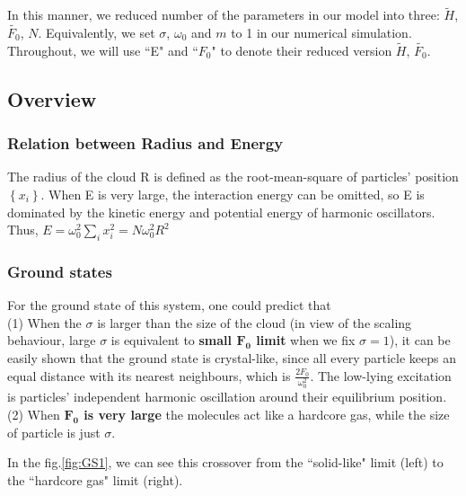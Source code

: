 \documentclass[aps,pre,twocolumn
,groupedaddress]{revtex4-1}
\begin{document}
In this manner, we reduced number of the parameters in our model into three: $\tilde{H}$, $\tilde{F_0}$, $N$. Equivalently, we set $\sigma$, $\omega_0$ and $m$ to 1 in our numerical simulation. Throughout, we will use ``E" and ``$F_0$" to denote their reduced version  $\tilde{H}$, $\tilde{F_0}$.

\subsection{Overview}
\subsubsection{Relation between Radius and Energy}
The radius of the cloud R is defined as the root-mean-square of particles' position $\left\lbrace x_i\right\rbrace$. When E is very large, the interaction energy can be omitted, so E is dominated by the kinetic energy and potential energy of harmonic oscillators. Thus, $E=\omega_0^2\sum_{i}x_i^2=N\omega_0^2R^2$ 

\begin{comment}
\begin{figure}
\centering
\texttt{[image: D:/OriginUserfiles/MPI\_internship/E\_R\_fitting.jpg]}
-\caption{E-R} This picture shows $E=kR^2$ when energy is large. ($k=N\omega_0^2$)
\end{figure}
\end{comment}

\subsubsection{Ground states}
For the ground state of this system, one could predict that \\(1) When the $\sigma$ is larger than the size of the cloud (in view of the scaling behaviour, large $\sigma$ is equivalent to \textbf{small $\mathbf{F_0}$ limit} when we fix $\sigma=1$), it can be easily shown that the ground state is crystal-like, since all every particle keeps an equal distance with its nearest neighbours, which is $\frac{2F_0}{\omega_0^2}$. The low-lying excitation is particles' independent harmonic oscillation around their equilibrium position.\\(2) When \textbf{$\mathbf{F_0}$ is very large} the molecules act like a hardcore gas, while the size of particle is just $\sigma$.

In the fig.\ref{fig:GS1}, we can see this crossover from the ``solid-like" limit (left) to the ``hardcore gas" limit (right).
\end{document}
